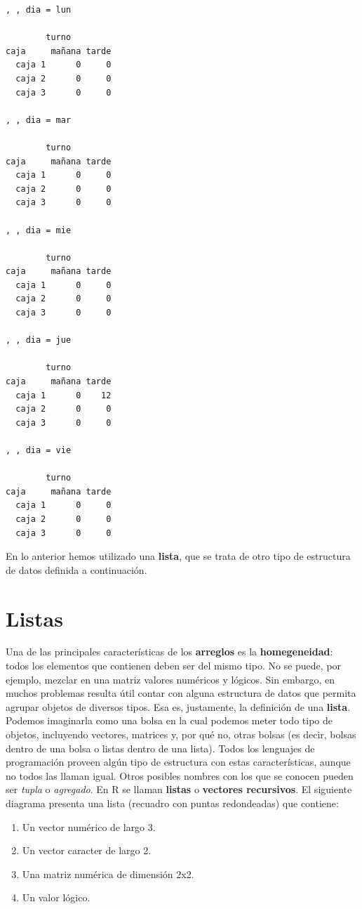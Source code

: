 \documentclass[
]{book}
\providecommand{\tightlist}{%
  \setlength{\itemsep}{0pt}\setlength{\parskip}{0pt}}
\begin{document}
\begin{verbatim}
, , dia = lun

        turno
caja     mañana tarde
  caja 1      0     0
  caja 2      0     0
  caja 3      0     0

, , dia = mar

        turno
caja     mañana tarde
  caja 1      0     0
  caja 2      0     0
  caja 3      0     0

, , dia = mie

        turno
caja     mañana tarde
  caja 1      0     0
  caja 2      0     0
  caja 3      0     0

, , dia = jue

        turno
caja     mañana tarde
  caja 1      0    12
  caja 2      0     0
  caja 3      0     0

, , dia = vie

        turno
caja     mañana tarde
  caja 1      0     0
  caja 2      0     0
  caja 3      0     0
\end{verbatim}

En lo anterior hemos utilizado una \textbf{lista}, que se trata de otro tipo de estructura de datos definida a continuación.

\hypertarget{listas}{%
\section{Listas}\label{listas}}

Una de las principales características de los \textbf{arreglos} es la \textbf{homegeneidad}: todos los elementos que contienen deben ser del mismo tipo. No se puede, por ejemplo, mezclar en una matriz valores numéricos y lógicos. Sin embargo, en muchos problemas resulta útil contar con alguna estructura de datos que permita agrupar objetos de diversos tipos. Esa es, justamente, la definición de una \textbf{lista}. Podemos imaginarla como una bolsa en la cual podemos meter todo tipo de objetos, incluyendo vectores, matrices y, por qué no, otras bolsas (es decir, bolsas dentro de una bolsa o listas dentro de una lista). Todos los lenguajes de programación proveen algún tipo de estructura con estas características, aunque no todos las llaman igual. Otros posibles nombres con los que se conocen pueden ser \emph{tupla} o \emph{agregado}. En R se llaman \textbf{listas} o \textbf{vectores recursivos}. El siguiente diagrama presenta una lista (recuadro con puntas redondeadas) que contiene:

\begin{enumerate}
\def\labelenumi{\arabic{enumi}.}
\tightlist
\item
  Un vector numérico de largo 3.
\item
  Un vector caracter de largo 2.
\item
  Una matriz numérica de dimensión 2x2.
\item
  Un valor lógico.
\end{enumerate}
\end{document}
